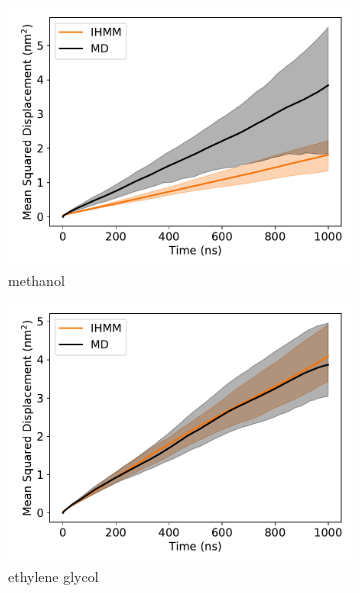 \documentclass[journal=jpcbfk,manuscript=article]{achemso}
\begin{document}
  \begin{figure}
  \centering
  \begin{subfigure}{0.45\textwidth}
  \includegraphics[width=\textwidth]{unclustered_msd_MET.pdf}
  \caption{methanol}\label{fig:unclustered_msd_MET}
  \end{subfigure}
  \begin{subfigure}{0.45\textwidth}
  \includegraphics[width=\textwidth]{unclustered_msd_GCL.pdf}
  \caption{ethylene glycol}\label{fig:unclustered_msd_GCL}
  \end{subfigure}
  \begin{subfigure}{0.45\textwidth}

\end{subfigure}
\end{figure}
\end{document}
